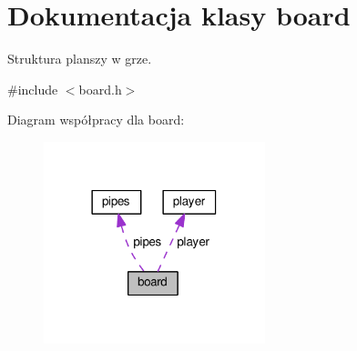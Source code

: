\hypertarget{structboard}{}\section{Dokumentacja klasy board}
\label{structboard}


Struktura planszy w grze.  




{\ttfamily \#include $<$board.\+h$>$}



Diagram współpracy dla board\+:
\nopagebreak
\begin{figure}[H]
\begin{center}
\leavevmode
\includegraphics[width=182pt]{structboard__coll__graph}
\end{center}
\end{figure}
